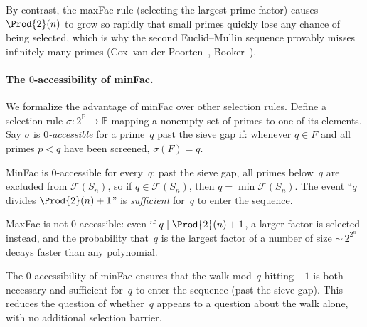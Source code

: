 By contrast, the maxFac rule (selecting the largest prime factor) causes
$\Prod{2}(n)$ to grow so rapidly that small primes quickly lose any chance
of being selected, which is why the second Euclid--Mullin sequence
provably misses infinitely many primes
(Cox--van der Poorten~\cite{CoxVdP1968}, Booker~\cite{BoSa2012}).

\paragraph{The $0$-accessibility of minFac.}
We formalize the advantage of minFac over other selection rules.  Define
a selection rule $\sigma\colon 2^{\mathbb{P}} \to \mathbb{P}$ mapping a
nonempty set of primes to one of its elements.  Say $\sigma$ is
\emph{$0$-accessible} for a prime~$q$ past the sieve gap if: whenever
$q \in F$ and all primes $p < q$ have been screened, $\sigma(F) = q$.

MinFac is $0$-accessible for every~$q$: past the sieve gap, all primes
below~$q$ are excluded from $\mathcal{F}(S_n)$, so if
$q \in \mathcal{F}(S_n)$, then $q = \min \mathcal{F}(S_n)$.  The event
``$q$ divides $\Prod{2}(n)+1$'' is \emph{sufficient} for~$q$ to enter the
sequence.

MaxFac is not $0$-accessible: even if $q \mid \Prod{2}(n)+1$, a larger
factor is selected instead, and the probability that~$q$ is the largest
factor of a number of size ${\sim}\, 2^{2^n}$ decays faster than any
polynomial.

The $0$-accessibility of minFac ensures that the walk mod~$q$ hitting
$-1$ is both necessary and sufficient for~$q$ to enter the sequence
(past the sieve gap).  This reduces the question of whether~$q$ appears
to a question about the walk alone, with no additional selection barrier.

